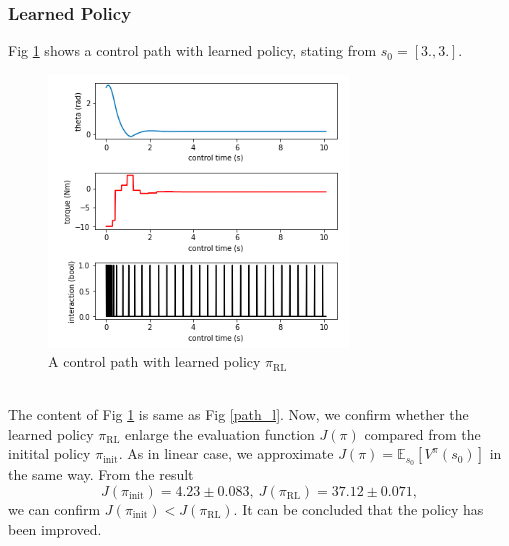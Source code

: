 \documentclass[english, dvipdfmx]{ampmt}             %
\newcommand{\expect}{\mathbb{E}}
\begin{document}
\subsubsection{Learned Policy}
Fig \ref{path_1} shows a control path with learned policy, stating from $s_0 = [3., 3.]$.
\begin{figure}[h]
	\centering
 	\includegraphics[width=8cm]{path_1.png}
 	\caption{A control path with learned policy $\pi_{\textrm{RL}}$} \label{path_1}
\end{figure}\\
The content of Fig \ref{path_1} is same as Fig \ref{path_l}.
Now, we confirm whether the learned policy $\pi_{\textrm{RL}}$ enlarge the evaluation function $J(\pi)$ compared from the initital policy $\pi_{\textrm{init}}$.  As in linear case, we approximate $J(\pi) = \expect_{s_0}[V^{\pi}(s_0)]$ in the same way. From the result
\begin{equation}
	J(\pi_{\textrm{init}}) = 4.23 \pm 0.083,~J(\pi_{\textrm{RL}}) = 37.12 \pm 0.071 \label{compare_policy}, 
\end{equation}
we can confirm $J(\pi_{\textrm{init}}) < J(\pi_{\textrm{RL}})$. It can be concluded that the policy has been improved.
\end{document}
